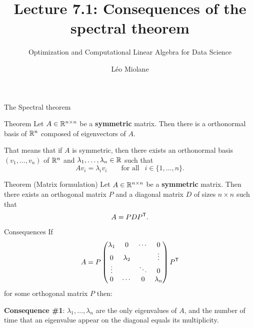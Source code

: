 \documentclass{beamer}
\title{Lecture 7.1: Consequences of the spectral theorem}
\subtitle{Optimization and Computational Linear Algebra for Data Science}
\author{Léo Miolane}
\date{}
\begin{document}
\setcounter{showProgressBar}{0}
\setcounter{showSlideNumbers}{0}

\frame{\titlepage}
\setcounter{framenumber}{0}
\setcounter{showSlideNumbers}{1}


\begin{frame}[t]{The Spectral theorem}
	\begin{block}{Theorem}
	Let $A \in \mathbb{R}^{n \times n}$ be a \textbf{symmetric} matrix. Then there is a orthonormal basis of $\mathbb{R}^n$ composed of eigenvectors of $A$.
	\end{block}

	That means that if $A$ is symmetric, then there exists an orthonormal basis $(v_1, \dots, v_n)$ of $\mathbb{R}^n$ and $\lambda_1,\dots, \lambda_n \in \mathbb{R}$ such that
	$$
	Av_i = \lambda_i v_i \qquad \text{for all } \ \ i \in \{1, \dots, n\}.
	$$

	\begin{block}{Theorem (Matrix formulation)}
	Let $A \in \mathbb{R}^{n \times n}$ be a \textbf{symmetric} matrix. Then there exists an orthogonal matrix $P$ and a diagonal matrix $D$ of sizes $n \times n$ such that
	$$
		A = P D P^{{\sf T}}.
	$$
	\end{block}
\end{frame}


\begin{frame}[t]{Consequences}
	If 
	$$
	A = P
	\begin{pmatrix}
		\lambda_1 & 0 & \cdots & 0 \\
		0 & \lambda_2 & & \vdots \\
		\vdots &  & \ddots & 0 \\
		0 & \cdots & 0 & \lambda_n \\
	\end{pmatrix}
	P^{{\sf T}}
	$$
	for some orthogonal matrix $P$ then:

	\vspace{1cm}

\textbf{Consequence \#1}: $\lambda_1, \dots, \lambda_n$ are the only eigenvalues of $A$, and the number of time that an eigenvalue appear on the diagonal equals its multiplicity.
\end{frame}
\end{document}
